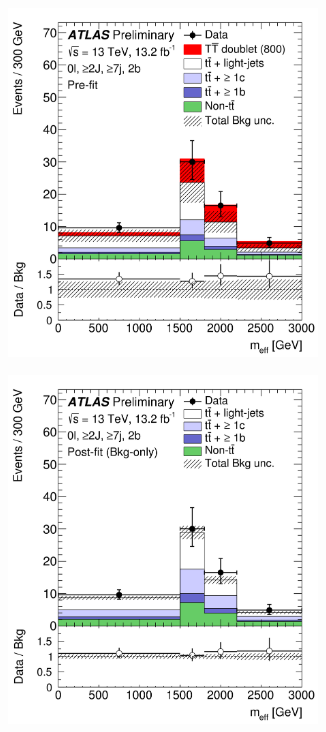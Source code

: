 \begin{figure}[p!]
\begin{subfigure}{0.24\textwidth}
  \caption{}
  \label{}
\end{subfigure}
\begin{subfigure}{0.24\textwidth}
  \centering
  \includegraphics[width=0.9\textwidth]{figures/VLQ/fig_12c.png}
  \caption{}
  \label{}
\end{subfigure}
\begin{subfigure}{0.24\textwidth}
  \centering
  \includegraphics[width=0.9\textwidth]{figures/VLQ/fig_12d.png}

\end{subfigure}
\end{figure}
